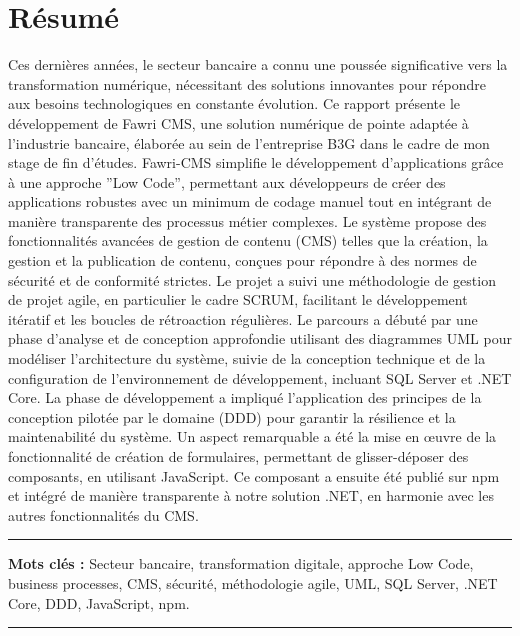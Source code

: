 \chapter*{Résumé}

\hspace{\parindent} Ces dernières années, le secteur bancaire a connu une poussée significative vers la transformation numérique, nécessitant des solutions innovantes pour répondre aux besoins technologiques en constante évolution. Ce rapport présente le développement de Fawri CMS, une solution numérique de pointe adaptée à l’industrie bancaire, élaborée au sein de l’entreprise B3G dans le cadre de mon stage de fin d’études. Fawri-CMS simplifie le développement d’applications grâce à une approche ”Low Code”, permettant aux développeurs de créer des applications robustes avec un minimum de codage manuel tout en intégrant de manière transparente des processus métier complexes. Le système propose des fonctionnalités avancées de gestion de contenu (CMS) telles que la création, la gestion et la publication de contenu, conçues pour répondre à des normes de sécurité et de conformité strictes. Le projet a suivi une méthodologie de gestion de projet agile, en particulier le cadre SCRUM, facilitant le développement itératif et les boucles de rétroaction régulières. Le parcours a débuté par une phase d’analyse et de conception approfondie utilisant des diagrammes UML pour modéliser l’architecture du système, suivie de la conception technique et de la configuration de l’environnement de développement, incluant SQL Server et .NET Core.
 La phase de développement a impliqué l’application des principes de la conception pilotée par le domaine (DDD) pour garantir la résilience et la maintenabilité du système. Un aspect remarquable a été la mise en œuvre de la fonctionnalité de création de formulaires, permettant de glisser-déposer des composants, en utilisant JavaScript. Ce composant a ensuite été publié sur npm et intégré de manière transparente à notre solution .NET, en harmonie avec les autres fonctionnalités du CMS.

\noindent\rule[2pt]{\textwidth}{0.5pt}

{\textbf{Mots clés :}}
Secteur bancaire, transformation digitale, approche Low Code, business processes, CMS, sécurité, méthodologie agile, UML, SQL Server, .NET Core, DDD, JavaScript, npm.
\\
\noindent\rule[2pt]{\textwidth}{0.5pt}